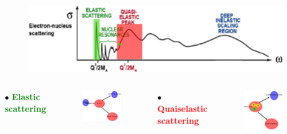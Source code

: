 \documentclass[12pt]{beamer}
\begin{document}
\begin{frame}

\begin{figure}[]
\centering
\includegraphics[width=12cm]{../images/Thesis/E_nucleus_spect_QE.png}
\end{figure}
\vspace*{-0.5cm}
\begin{columns}[t] %
$\bullet$ \textbf{\textcolor{green}{Elastic scattering}}\\
\begin{figure}[]
\includegraphics[width=3.5cm]{../images/elast_draw.png}
\end{figure}
$\bullet$ \textbf{\textcolor{red}{Quaiselastic scattering}}\\
\vspace{-20pt}
\begin{figure}[]
\includegraphics[width=3.5cm]{../images/quais_draw.png}
\end{figure}


\end{columns}
\end{frame}

\end{document}
